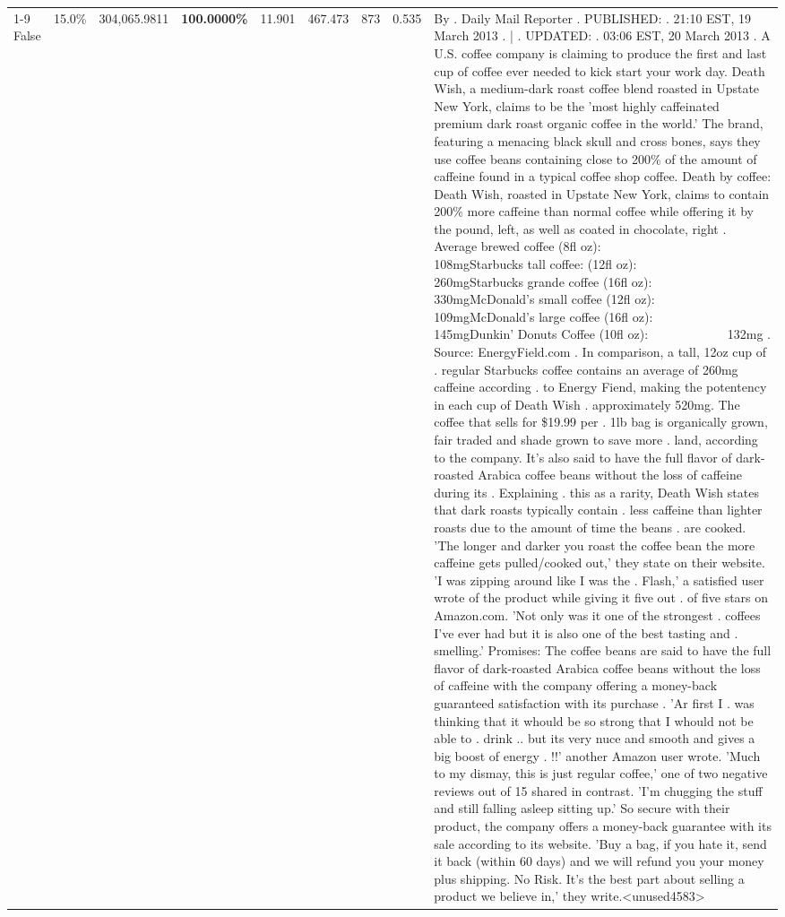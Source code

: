 \begin{table}[H]
{\begin{tabular}{lllrlllll}
\cline{1-9}
False & 15.0\% & 304,065.9811 & \bfseries \color{red} 100.0000\% & 11.901 & 467.473 & 873 & 0.535 & By . Daily Mail Reporter . PUBLISHED: . 21:10 EST, 19 March 2013 . | . UPDATED: . 03:06 EST, 20 March 2013 . A U.S. coffee company is claiming to produce the first and last cup of coffee ever needed to kick start your work day. Death Wish, a medium-dark roast coffee blend roasted in Upstate New York, claims to be the 'most highly caffeinated premium dark roast organic coffee in the world.' The brand, featuring a menacing black skull and cross bones, says they use coffee beans containing close to 200\% of the amount of caffeine found in a typical coffee shop coffee. Death by coffee: Death Wish, roasted in Upstate New York, claims to contain 200\% more caffeine than normal coffee while offering it by the pound, left, as well as coated in chocolate, right . Average brewed coffee (8fl oz):              108mgStarbucks tall coffee: (12fl oz):                260mgStarbucks grande coffee (16fl oz):         330mgMcDonald's small coffee (12fl oz):           109mgMcDonald's large coffee (16fl oz):           145mgDunkin' Donuts Coffee (10fl oz):             132mg . Source: EnergyField.com . In comparison, a tall, 12oz cup of . regular Starbucks coffee contains an average of 260mg caffeine according . to Energy Fiend, making the potentency in each cup of Death Wish . approximately 520mg. The coffee that sells for \$19.99 per . 1lb bag is organically grown, fair traded and shade grown to save more . land, according to the company. It's also said to have the full flavor of dark-roasted Arabica coffee beans without the loss of caffeine during its . Explaining . this as a rarity, Death Wish states that dark roasts typically contain . less caffeine than lighter roasts due to the amount of time the beans . are cooked. 'The longer and darker you roast the coffee bean the more caffeine gets pulled/cooked out,' they state on their website. 'I was zipping around like I was the . Flash,' a satisfied user wrote of the product while giving it five out . of five stars on Amazon.com. 'Not only was it one of the strongest . coffees I've ever had but it is also one of the best tasting and . smelling.’ Promises: The coffee beans are said to have the full flavor of dark-roasted Arabica coffee beans without the loss of caffeine with the company offering a money-back guaranteed satisfaction with its purchase . 'Ar first I . was thinking that it whould be so strong that I whould not be able to . drink .. but its very nuce and smooth and gives a big boost of energy . !!' another Amazon user wrote. 'Much to my dismay, this is just regular coffee,' one of two negative reviews out of 15 shared in contrast. 'I'm chugging the stuff and still falling asleep sitting up.' So secure with their product, the company offers a money-back guarantee with its sale according to its website. 'Buy a bag, if you hate it, send it back (within 60 days) and we will refund you your money plus shipping. No Risk. It’s the best part about selling a product we believe in,' they write.<unused4583> \\

\end{tabular}}
\end{table}
